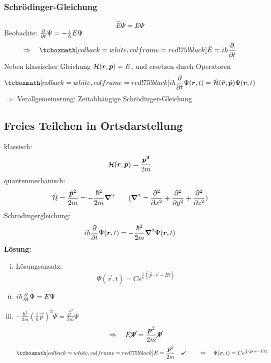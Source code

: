 \subsubsection{Schrödinger-Gleichung}

\begin{equation*}
\hat{E} \Psi = E \Psi
\end{equation*}
Beobachte: $ \prt{}{t} \Psi = - \frac{i}{\hbar} E \Psi $
\begin{equation*}
\Rightarrow \quad \rmbox{\hat{E} = i \hbar \prt{}{t}}
\end{equation*}
Neben klassischer Gleichung $ \ham(\vec{r},\vec{p}) = E $, und ersetzen durch Operatoren
\begin{equation*}
\rmbox{i \hbar \prt{}{t} \Psi(\vec{r},t) = \hat{\ham}(\hat{\vec{r}}, \hat{\vec{p}}) \Psi(\vec{r},t)}
\end{equation*}
$ \Rightarrow $ Verallgemeinerung: Zeitabhängige Schrödinger-Gleichung

\subsection{Freies Teilchen in Ortsdarstellung}

klassisch:
\begin{equation*}
\ham (\vec{r}, \vec{p}) = \frac{\vec{p^2}}{2 m}
\end{equation*}
quantenmechanisch:
\begin{equation*}
\hat{\ham} = \frac{\hat{\vec{p}}^2}{2 m} = - \frac{\hbar^2}{2 m} \vabla^2 \qquad (\vabla^2 = \prt{^2}{x^2} + \prt{^2}{y^2} + \prt{^2}{z^2})
\end{equation*}
Schrödingergleichung:
\begin{equation*}
i \hbar \prt{}{t} \Psi(\vec{r},t) = - \frac{\hbar^2}{2 m} \vabla^2 \Psi(\vec{r},t)
\end{equation*}
\textbf{Lösung:}
\begin{enumerate}[i)]
	\item Lösungsansatz:
	\begin{equation*}
	\Psi(\vec{r},t) = Ce^{\frac{i}{\hbar} (\vec{p} \cdot \vec{r} - E t)}
	\end{equation*}
	\item $ i \hbar \prt{}{t} \Psi = E \Psi $
	\item $ -\frac{\hbar^2}{2 m} \left(\frac{i}{\hbar} \vec{p}\right)^2 \Psi = \frac{\vec{p}^2}{2 m} \Psi $
	\begin{equation*}
	\Rightarrow \quad E \cancel{\Psi} = \frac{\vec{p}^2}{2 m} \cancel{\Psi}
	\end{equation*}
	\begin{equation*}
	\rmbox{E = \frac{\vec{p}^2}{2 m}} \quad \checkmark \qquad \Rightarrow \quad \Psi(\vec{r},t) = C e^{\frac{i}{\hbar} (\vec{p} \cdot \vec{r} - E t)}
	\end{equation*}
\end{enumerate}


